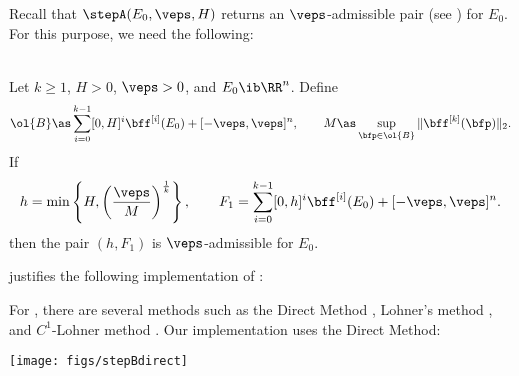 
	
	Recall that $\stepA(E_0,\veps,H)$ returns an
	$\veps$-admissible pair (see ) for $E_0$.
	For this purpose, we need the following:

	\bleml[ad]\ \\
	Let $ k \geq 1 $, $ H > 0 $, $ \veps > 0 $, and 
	$ E_0 \ib \RR^n $. Define  
	\[
		\ol{B} \as \sum_{i=0}^{k-1} [0, H]^i \bff^{[i]}(E_0)
				+ 	[-\veps, \veps]^n, \qquad
		M \as \sup_{\bfp \in \ol{B}} \| \bff^{[k]}(\bfp) \|_2.
	\]  
	If
	\[
		h = \min \left\{ H, \left( \frac{\veps}{M} 	\right)^{\frac{1}{k}}
				\right\},  \qquad
		F_1 = \sum_{i=0}^{k-1} [0, h]^i \bff^{[i]}(E_0) + 
			[-\veps, \veps]^n.
	\]  
	then the pair $(h, F_1)$ is $\veps$-admissible for $E_0$.
	\eleml
	
	 justifies the following implementation of \stepA:
	
	\Ldent{}
	
	
	For \stepb, there are several methods such as
	the Direct Method \cite{nedialkov+2:validated-ode:99},
	Lohner's method \cite{lohner:thesis},
	and $C^1$-Lohner method \cite{wilczak-zgliczynski:lohner:11}.
	Our implementation uses the Direct Method:

		\texttt{[image: figs/stepBdirect]}
	\eeql
	
